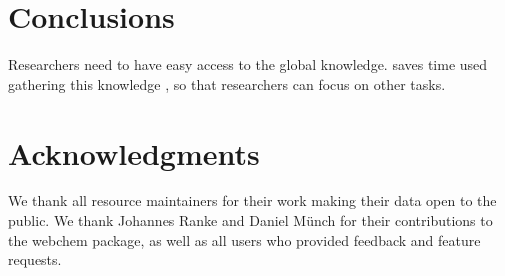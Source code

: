 \documentclass[article, shortnames]{jss}\usepackage[]{graphicx}\usepackage[]{color}
\begin{document}
\section[Conclusions]{Conclusions}
Researchers need to have easy access to the global knowledge.
 saves time used gathering this knowledge \citep{Munch_Galizia_2016}, so that researchers can focus on other tasks.


\section*{Acknowledgments}
We thank all resource maintainers for their work making their data open to the public.
We thank Johannes Ranke and Daniel Münch for their contributions to the webchem package, as well as all users who provided feedback and feature requests.



\end{document}
